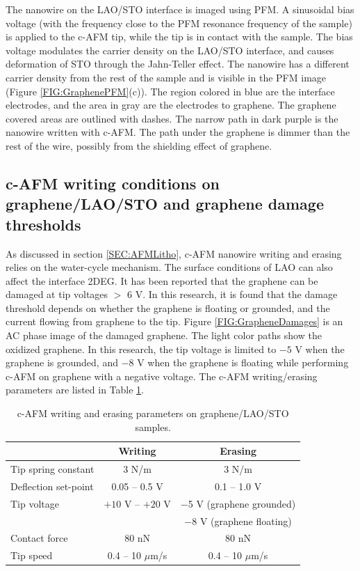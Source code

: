 \documentclass[pdflatex, sectionletters, 12pt]{pittetd}    %
\begin{document}
The nanowire on the LAO/STO interface is imaged using PFM. A sinusoidal bias voltage (with the frequency close to the PFM resonance frequency of the sample) is applied to the c-AFM tip, while the tip is in contact with the sample. The bias voltage modulates the carrier density on the LAO/STO interface, and causes deformation of STO through the Jahn-Teller effect\cite{huang2013direct, vonk2007interface, salluzzo2009orbital, park2006charge}. The nanowire has a different carrier density from the rest of the sample and is visible in the PFM image (Figure \ref{FIG:GraphenePFM}(c)). The region colored in blue are the interface electrodes, and the area in gray are the electrodes to graphene. The graphene covered areas are outlined with dashes. The narrow path in dark purple is the nanowire written with c-AFM. The path under the graphene is dimmer than the rest of the wire, possibly from the shielding effect of graphene.


\subsection{c-AFM writing conditions on graphene/LAO/STO and graphene damage thresholds}

As discussed in section \ref{SEC:AFMLitho}, c-AFM nanowire writing and erasing relies on the water-cycle mechanism. The surface conditions of LAO can also affect the interface 2DEG\cite{brown2016giant, xie2011control, xie2013enhancing, aliaj2018probing}. It has been reported\cite{alaboson2011conductive} that the graphene can be damaged at tip voltages $>$ 6 V. In this research, it is found that the damage threshold depends on whether the graphene is floating or grounded, and the current flowing from graphene to the tip. Figure \ref{FIG:GrapheneDamages} is an AC phase image of the damaged graphene. The light color paths show the oxidized graphene. In this research, the tip voltage is limited to $-5$ V when the graphene is grounded, and $-8$ V when the graphene is floating while performing c-AFM on graphene with a negative voltage. The c-AFM writing/erasing parameters are listed in Table \ref{TAB:GCOLithography}.
\\

\begin{table}[h!]
	\centering
	\begin{tabular}{l|cc}
		\hline
		&    Writing    &    Erasing \\ \hline
		Tip spring constant    &    3 N/m    & 3 N/m    \\ 
		Deflection set-point    &    0.05 -- 0.5 V    &    0.1 -- 1.0 V    \\    
		Tip voltage    &    $+10$ V -- $+20$ V    & $-$5 V (graphene grounded) \\
		&    & $-$8 V (graphene floating) \\
		Contact force    &    80 nN    &    80 nN    \\
		Tip speed    &    0.4 -- 10 $\mu$m/s    &    0.4 -- 10 $\mu$m/s \\ \hline 
	\end{tabular}
	\caption{c-AFM writing and erasing parameters on graphene/LAO/STO samples.}
	\label{TAB:GCOLithography}
\end{table}
\end{document}
